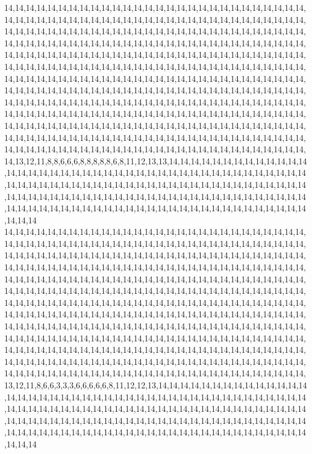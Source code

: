 14,14,14,14,14,14,14,14,14,14,14,14,14,14,14,14,14,14,14,14,14,14,14,14,14,14,14,14,14,14,14,14,14,14,14,14,14,14,14,14,14,14,14,14,14,14,14,14,14,14,14,14,14,14,14,14,14,14,14,14,14,14,14,14,14,14,14,14,14,14,14,14,14,14,14,14,14,14,14,14,14,14,14,14,14,14,14,14,14,14,14,14,14,14,14,14,14,14,14,14,14,14,14,14,14,14,14,14,14,14,14,14,14,14,14,14,14,14,14,14,14,14,14,14,14,14,14,14,14,14,14,14,14,14,14,14,14,14,14,14,14,14,14,14,14,14,14,14,14,14,14,14,14,14,14,14,14,14,14,14,14,14,14,14,14,14,14,14,14,14,14,14,14,14,14,14,14,14,14,14,14,14,14,14,14,14,14,14,14,14,14,14,14,14,14,14,14,14,14,14,14,14,14,14,14,14,14,14,14,14,14,14,14,14,14,14,14,14,14,14,14,14,14,14,14,14,14,14,14,14,14,14,14,14,14,14,14,14,14,14,14,14,14,14,14,14,14,14,14,14,14,14,14,14,14,14,14,14,14,14,14,14,14,14,14,14,14,14,14,14,14,14,14,14,14,14,14,14,14,14,14,14,14,14,14,14,14,14,14,14,14,14,14,14,14,14,14,14,14,14,14,14,14,14,14,14,14,14,14,14,14,14,14,14,14,14,14,14,14,14,14,14,14,14,14,14,14,14,14,14,14,14,14,14,14,14,14,14,14,14,14,14,14,14,14,14,14,14,14,14,14,14,14,14,14,14,14,14,14,14,14,14,14,14,14,13,12,11,8,8,6,6,6,8,8,8,8,8,6,8,11,12,13,13,14,14,14,14,14,14,14,14,14,14,14,14,14,14,14,14,14,14,14,14,14,14,14,14,14,14,14,14,14,14,14,14,14,14,14,14,14,14,14,14,14,14,14,14,14,14,14,14,14,14,14,14,14,14,14,14,14,14,14,14,14,14,14,14,14,14,14,14,14,14,14,14,14,14,14,14,14,14,14,14,14,14,14,14,14,14,14,14,14,14,14,14,14,14,14,14,14,14,14,14,14,14,14,14,14,14,14,14,14,14,14,14,14,14,14,14,14,14,14,14,14,14,14,14,14,14,14,14
14,14,14,14,14,14,14,14,14,14,14,14,14,14,14,14,14,14,14,14,14,14,14,14,14,14,14,14,14,14,14,14,14,14,14,14,14,14,14,14,14,14,14,14,14,14,14,14,14,14,14,14,14,14,14,14,14,14,14,14,14,14,14,14,14,14,14,14,14,14,14,14,14,14,14,14,14,14,14,14,14,14,14,14,14,14,14,14,14,14,14,14,14,14,14,14,14,14,14,14,14,14,14,14,14,14,14,14,14,14,14,14,14,14,14,14,14,14,14,14,14,14,14,14,14,14,14,14,14,14,14,14,14,14,14,14,14,14,14,14,14,14,14,14,14,14,14,14,14,14,14,14,14,14,14,14,14,14,14,14,14,14,14,14,14,14,14,14,14,14,14,14,14,14,14,14,14,14,14,14,14,14,14,14,14,14,14,14,14,14,14,14,14,14,14,14,14,14,14,14,14,14,14,14,14,14,14,14,14,14,14,14,14,14,14,14,14,14,14,14,14,14,14,14,14,14,14,14,14,14,14,14,14,14,14,14,14,14,14,14,14,14,14,14,14,14,14,14,14,14,14,14,14,14,14,14,14,14,14,14,14,14,14,14,14,14,14,14,14,14,14,14,14,14,14,14,14,14,14,14,14,14,14,14,14,14,14,14,14,14,14,14,14,14,14,14,14,14,14,14,14,14,14,14,14,14,14,14,14,14,14,14,14,14,14,14,14,14,14,14,14,14,14,14,14,14,14,14,14,14,14,14,14,14,14,14,14,14,14,14,14,14,14,14,14,14,14,14,14,14,14,14,14,14,14,14,14,14,14,14,14,14,14,14,13,12,11,8,6,6,3,3,3,6,6,6,6,6,8,11,12,12,13,14,14,14,14,14,14,14,14,14,14,14,14,14,14,14,14,14,14,14,14,14,14,14,14,14,14,14,14,14,14,14,14,14,14,14,14,14,14,14,14,14,14,14,14,14,14,14,14,14,14,14,14,14,14,14,14,14,14,14,14,14,14,14,14,14,14,14,14,14,14,14,14,14,14,14,14,14,14,14,14,14,14,14,14,14,14,14,14,14,14,14,14,14,14,14,14,14,14,14,14,14,14,14,14,14,14,14,14,14,14,14,14,14,14,14,14,14,14,14,14,14,14,14,14,14,14,14,14,14

